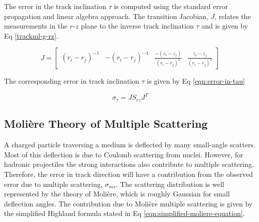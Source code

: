The error in the track inclination $\tau$ is computed using the standard error propagation and linear algebra approach. The transition Jacobian, $J$, relates the measurements in the $r$-$z$ plane to the inverse track inclination $\tau$ and is given by Eq \eqref{trackml-g-rz}.




\begin{equation}
    J = \begin{bmatrix} 
            (r_i - r_j)^{-1} &
            -(r_i - r_j)^{-1} & 
            \frac{-(z_i - z_j)}{(r_i - r_j)^2} & 
            \frac{z_i - z_j}{(r_i - r_j)^2}
            \end{bmatrix} 
    \label{trackml-g-rz}
\end{equation}

The corresponding error in track inclination $\tau$ is given by Eq \eqref{eqn:error-in-tau}

\begin{equation}
    \sigma_{\tau} = J S_{rz} J^{T}
    \label{eqn:error-in-tau}
\end{equation}






\subsection{Moli\`ere Theory of Multiple Scattering}

A charged particle traversing a medium is deflected by many small-angle scatters. Most of this deflection is due to Coulomb scattering from nuclei. However, for hadronic projectiles the strong interactions also contribute to multiple scattering. Therefore, the error in track direction will have a contribution from the observed error due to multiple scattering, $\sigma_{ms}$. The scattering distribution is well represented by the theory of Moli\`ere, which is roughly Gaussian for small deflection angles. The contribution due to Moli\`ere multiple scattering is given by the simplified Highland formula \cite{moliere-theory-formula, Lynch:1990sq} stated in Eq \eqref{eqn:simplified-moliere-equation}.


